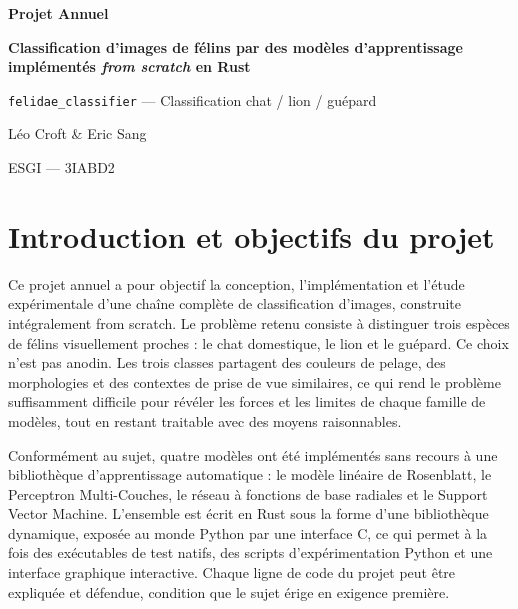 \documentclass[11pt,a4paper]{report}
\begin{document}
\begin{titlepage}
  \centering
  \vspace*{2cm}
  {\LARGE \textbf{Projet Annuel}\par}
  \vspace{1cm}
  {\Huge \bfseries Classification d'images de félins par des modèles d'apprentissage implémentés \emph{from scratch} en Rust\par}
  \vspace{1.5cm}
  {\Large \texttt{felidae\_classifier} --- Classification chat / lion / guépard\par}
  \vfill
  {\Large Léo Croft \& Eric Sang\par}
  \vspace{0.3cm}
  {\large ESGI --- 3IABD2\par}
  \vspace{1.5cm}
\end{titlepage}

\tableofcontents
\clearpage

\hypertarget{introduction-et-objectifs-du-projet}{%
\chapter{Introduction et objectifs du
projet}\label{introduction-et-objectifs-du-projet}}

Ce projet annuel a pour objectif la conception, l'implémentation et
l'étude expérimentale d'une chaîne complète de classification d'images,
construite intégralement from scratch. Le problème retenu consiste à
distinguer trois espèces de félins visuellement proches : le chat
domestique, le lion et le guépard. Ce choix n'est pas anodin. Les trois
classes partagent des couleurs de pelage, des morphologies et des
contextes de prise de vue similaires, ce qui rend le problème
suffisamment difficile pour révéler les forces et les limites de chaque
famille de modèles, tout en restant traitable avec des moyens
raisonnables.

Conformément au sujet, quatre modèles ont été implémentés sans recours à
une bibliothèque d'apprentissage automatique : le modèle linéaire de
Rosenblatt, le Perceptron Multi-Couches, le réseau à fonctions de base
radiales et le Support Vector Machine. L'ensemble est écrit en Rust sous
la forme d'une bibliothèque dynamique, exposée au monde Python par une
interface C, ce qui permet à la fois des exécutables de test natifs, des
scripts d'expérimentation Python et une interface graphique interactive.
Chaque ligne de code du projet peut être expliquée et défendue,
condition que le sujet érige en exigence première.
\end{document}
